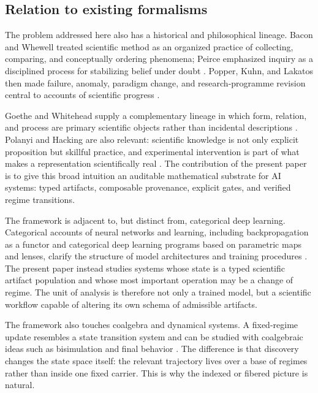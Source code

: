 \documentclass[11pt]{article}
\theoremstyle{definition}
\begin{document}
\FloatBarrier

\subsection{Relation to existing formalisms}
\label{sec:related}

The problem addressed here also has a historical and philosophical lineage. Bacon and Whewell treated scientific method as an organized practice of collecting, comparing, and conceptually ordering phenomena; Peirce emphasized inquiry as a disciplined process for stabilizing belief under doubt \citep{bacon_novum_organum_1620,whewell_inductive_sciences_1840,peirce_fixation_1877}. Popper, Kuhn, and Lakatos then made failure, anomaly, paradigm change, and research-programme revision central to accounts of scientific progress \citep{popper_logic_1959,kuhn_structure_1962,lakatos_falsification_1970}.

Goethe and Whitehead supply a complementary lineage in which form, relation, and process are primary scientific objects rather than incidental descriptions \citep{goethe_metamorphosis_1790,whitehead_science_modern_world_1925}. Polanyi and Hacking are also relevant: scientific knowledge is not only explicit proposition but skillful practice, and experimental intervention is part of what makes a representation scientifically real \citep{polanyi_personal_knowledge_1958,hacking_representing_intervening_1983}. The contribution of the present paper is to give this broad intuition an auditable mathematical substrate for AI systems: typed artifacts, composable provenance, explicit gates, and verified regime transitions.

The framework is adjacent to, but distinct from, categorical deep learning. Categorical accounts of neural networks and learning, including backpropagation as a functor and categorical deep learning programs based on parametric maps and lenses, clarify the structure of model architectures and training procedures \citep{fong_spivak_tuyeras_2019,gavranovic_cdl_2024,cruttwell_parametric_lenses_2024,crescenzi_zanasi_survey_2024}. The present paper instead studies systems whose state is a typed scientific artifact population and whose most important operation may be a change of regime. The unit of analysis is therefore not only a trained model, but a scientific workflow capable of altering its own schema of admissible artifacts.

The framework also touches coalgebra and dynamical systems. A fixed-regime update resembles a state transition system and can be studied with coalgebraic ideas such as bisimulation and final behavior \citep{aczel_mendler_1989,rutten_coalgebra_2000}. The difference is that discovery changes the state space itself: the relevant trajectory lives over a base of regimes rather than inside one fixed carrier. This is why the indexed or fibered picture is natural.
\end{document}
